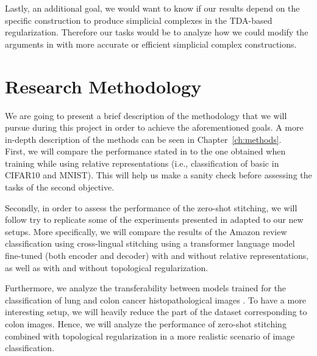 \documentclass[../main.tex]{subfiles}
\begin{document}
Lastly, an additional goal, we would want to know if our results depend on the specific construction to produce simplicial complexes in the TDA-based regularization. Therefore our tasks would be to analyze how we could  modify the arguments in \cite{hofer_densified_2021} with more accurate or efficient simplicial complex constructions. 


\section{Research Methodology}

We are going to present a brief description of the methodology that we will pursue during this project in order to achieve the aforementioned goals. A more in-depth description of the methods can be seen in Chapter~\ref{ch:methods}.\\

First, we will compare the performance stated in \cite{hofer_densified_2021} to the one obtained when training while using relative representations (i.e., classification of basic  in CIFAR10 and MNIST). This will help us make a sanity check before assessing the tasks of the second objective.

Secondly, in order to assess the performance of the zero-shot stitching, we will follow try to replicate some of the experiments presented in \cite{moschella_relative_2022} adapted to our new setups. More specifically, we will compare the results of the Amazon review classification using cross-lingual stitching using a transformer language model fine-tuned (both encoder and decoder) with and without relative representations, as well as with and without topological regularization. 

Furthermore, we analyze the transferability between  models \cite{dosovitskiy_vit_2021} trained for the classification of lung and colon cancer histopathological images \cite{borkowski_lung_2019}. To have a more interesting setup, we will heavily reduce the part of the dataset corresponding to colon images. Hence, we will analyze the performance of zero-shot stitching combined with topological regularization in a more realistic scenario of image classification.\\
\end{document}
